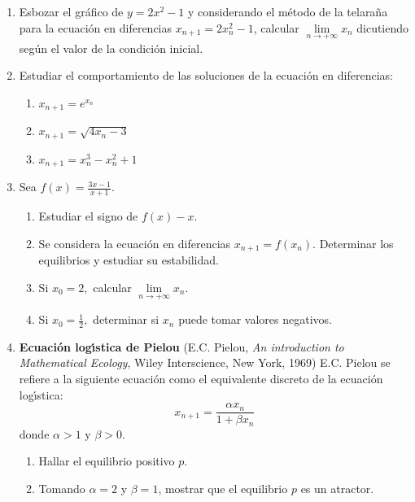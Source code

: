 \documentclass{article}
\begin{document}
\begin{enumerate}
\item Esbozar el gr\'{a}fico de $y=2x^{2}-1$ y considerando el m\'{e}todo de
la telara\~{n}a para la ecuaci\'{o}n en diferencias $x_{n+1}=2x_{n}^{2}-1$,
calcular $\underset{n\rightarrow +\infty }{\lim }x_{n}$ dicutiendo seg\'{u}n
el valor de la condici\'{o}n inicial.

\item Estudiar el comportamiento de las soluciones de la ecuaci\'{o}n en
diferencias:

\begin{enumerate}
\item $x_{n+1}=e^{x_{n}}$

\item $x_{n+1}=\sqrt{4x_{n}-3}$

\item $x_{n+1}=x_{n}^{3}-x_{n}^{2}+1$
\end{enumerate}

\item Sea $f(x)=\frac{3x-1}{x+1}.$

\begin{enumerate}
\item Estudiar el signo de $f(x)-x$.

\item Se considera la ecuaci\'{o}n en diferencias $x_{n+1}=f(x_{n}).$
Determinar los equilibrios y estudiar su estabilidad.

\item Si $x_{0}=2,$ calcular $\underset{n\rightarrow +\infty }{\lim }x_{n}$.

\item Si $x_{0}=\frac{1}{2},$ determinar si $x_{n}$ puede tomar valores
negativos.
\end{enumerate}

\item \textbf{Ecuaci\'{o}n log\'{\i}stica de Pielou} (E.C. Pielou, \textit{%
An introduction to Mathematical Ecology}, Wiley Interscience, New York,
1969) E.C. Pielou se refiere a la siguiente ecuaci\'{o}n como el equivalente
discreto de la ecuaci\'{o}n log\'{\i}stica:%
\begin{equation*}
x_{n+1}=\frac{\alpha x_{n}}{1+\beta x_{n}}
\end{equation*}%
donde $\alpha >1$ y $\beta >0$.

\begin{enumerate}
\item Hallar el equilibrio positivo $p$.

\item Tomando $\alpha =2$ y $\beta =1$, mostrar que el equilibrio $p$ es un
atractor.


\end{enumerate}
\end{enumerate}
\end{document}
